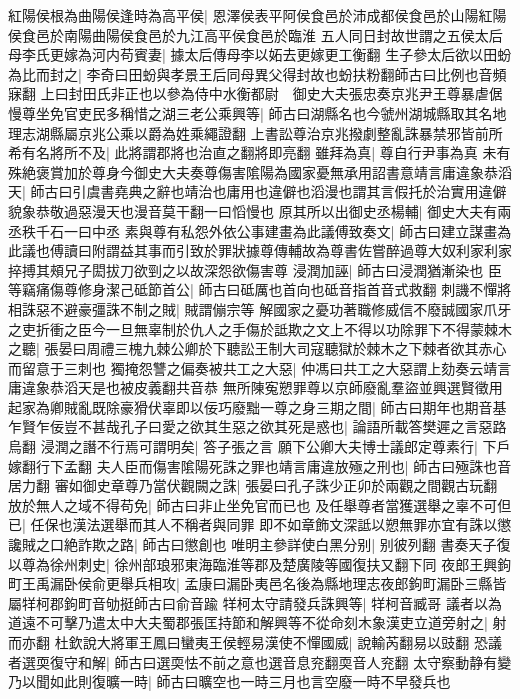 紅陽侯根為曲陽侯逢時為高平侯|{
	恩澤侯表平阿侯食邑於沛成都侯食邑於山陽紅陽侯食邑於南陽曲陽侯食邑於九江高平侯食邑於臨淮}
五人同日封故世謂之五侯太后母李氏更嫁為河内苟賓妻|{
	據太后傳母李以妬去更嫁更工衡翻}
生子參太后欲以田蚡為比而封之|{
	李奇曰田蚡與孝景王后同母異父得封故也蚡扶粉翻師古曰比例也音頻寐翻}
上曰封田氏非正也以參為侍中水衡都尉　御史大夫張忠奏京兆尹王尊暴虐倨慢尊坐免官吏民多稱惜之湖三老公乘興等|{
	師古曰湖縣名也今虢州湖城縣取其名地理志湖縣屬京兆公乘以爵為姓乘繩證翻}
上書訟尊治京兆撥劇整亂誅暴禁邪皆前所希有名將所不及|{
	此將謂郡將也治直之翻將即亮翻}
雖拜為真|{
	尊自行尹事為真}
未有殊絶褒賞加於尊身今御史大夫奏尊傷害隂陽為國家憂無承用詔書意靖言庸違象恭滔天|{
	師古曰引虞書堯典之辭也靖治也庸用也違僻也滔漫也謂其言假托於治實用違僻貌象恭敬過惡漫天也漫音莫干翻一曰慆慢也}
原其所以出御史丞楊輔|{
	御史大夫有兩丞秩千石一曰中丞}
素與尊有私怨外依公事建畫為此議傅致奏文|{
	師古曰建立謀畫為此議也傅讀曰附謂益其事而引致於罪狀據尊傳輔故為尊書佐嘗醉過尊大奴利家利家捽搏其頰兄子閎拔刀欲剄之以故深怨欲傷害尊}
浸潤加誣|{
	師古曰浸潤猶漸染也}
臣等竊痛傷尊修身潔己砥節首公|{
	師古曰砥厲也首向也砥音指首音式救翻}
刺譏不憚將相誅惡不避豪彊誅不制之賊|{
	賊謂傰宗等}
解國家之憂功著職修威信不廢誠國家爪牙之吏折衝之臣今一旦無辜制於仇人之手傷於詆欺之文上不得以功除罪下不得蒙棘木之聽|{
	張晏曰周禮三槐九棘公卿於下聽訟王制大司寇聽獄於棘木之下棘者欲其赤心而留意于三刺也}
獨掩怨讐之偏奏被共工之大惡|{
	仲馮曰共工之大惡謂上劾奏云靖言庸違象恭滔天是也被皮義翻共音恭}
無所陳寃愬罪尊以京師廢亂羣盜並興選賢徵用起家為卿賊亂既除豪猾伏辜即以佞巧廢黜一尊之身三期之間|{
	師古曰期年也期音基}
乍賢乍佞豈不甚哉孔子曰愛之欲其生惡之欲其死是惑也|{
	論語所載答樊遲之言惡路烏翻}
浸潤之譖不行焉可謂明矣|{
	答子張之言}
願下公卿大夫博士議郎定尊素行|{
	下戶嫁翻行下孟翻}
夫人臣而傷害隂陽死誅之罪也靖言庸違放殛之刑也|{
	師古曰殛誅也音居力翻}
審如御史章尊乃當伏觀闕之誅|{
	張晏曰孔子誅少正卯於兩觀之間觀古玩翻}
放於無人之域不得苟免|{
	師古曰非止坐免官而已也}
及任舉尊者當獲選舉之辜不可但已|{
	任保也漢法選舉而其人不稱者與同罪}
即不如章飾文深詆以愬無罪亦宜有誅以懲讒賊之口絶詐欺之路|{
	師古曰懲創也}
唯明主參詳使白黑分别|{
	别彼列翻}
書奏天子復以尊為徐州刺史|{
	徐州部琅邪東海臨淮等郡及楚廣陵等國復扶又翻下同}
夜郎王興鉤町王禹漏卧侯俞更舉兵相攻|{
	孟康曰漏卧夷邑名後為縣地理志夜郎鉤町漏卧三縣皆屬䍧柯郡鉤町音劬挺師古曰俞音踰}
䍧柯太守請發兵誅興等|{
	䍧柯音臧哥}
議者以為道遠不可擊乃遣太中大夫蜀郡張匡持節和解興等不從命刻木象漢吏立道旁射之|{
	射而亦翻}
杜欽說大將軍王鳳曰蠻夷王侯輕易漢使不憚國威|{
	說輸芮翻易以豉翻}
恐議者選耎復守和解|{
	師古曰選耎怯不前之意也選音息兖翻耎音人兖翻}
太守察動静有變乃以聞如此則復曠一時|{
	師古曰曠空也一時三月也言空廢一時不早發兵也}
